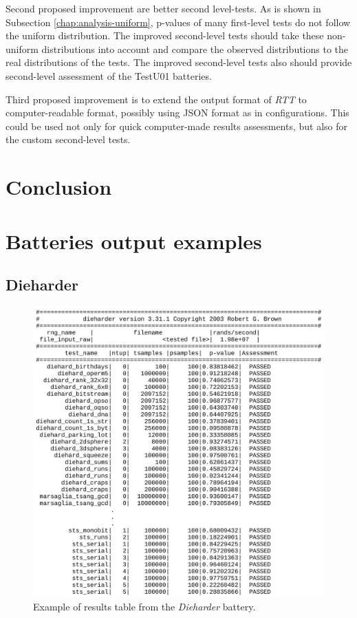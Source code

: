 \documentclass[
  digital,     %
  oneside,     %
  nosansbold,  %
  nocolorbold, %
  nolof,         %
  nolot,         %
]{fithesis4}
\begin{document}
Second proposed improvement are better second level-tests. As is shown in Subsection \ref{chap:analysis-uniform}, p-values of many first-level tests do not follow the uniform distribution. The improved second-level tests should take these non-uniform distributions into account and compare the observed distributions to the real distributions of the tests. The improved second-level tests also should provide second-level assessment of the TestU01 batteries.

Third proposed improvement is to extend the output format of \emph{RTT} to computer-readable format, possibly using JSON format as in configurations. This could be used not only for quick computer-made results assessments, but also for the custom second-level tests.


\chapter{Conclusion}

\appendix 

\chapter{Batteries output examples} \label{append:dieharder-output}
\section{Dieharder}

\begin{figure}[H]
  \begin{center}
    \includegraphics[width=12.5cm]{figures/outputs-appendix/dieharder.jpg}
  \end{center}
  \caption{Example of results table from the \emph{Dieharder} battery.}
  \label{fig:die_out}
\end{figure}
\end{document}
